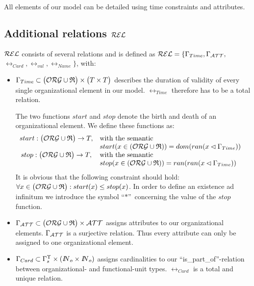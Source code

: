 	All elements of our model can be detailed using time constraints and attributes.

\subsection{Additional relations $\mathcal{REL}$}

	$\mathcal{REL}$ consists of several relations and is defined as $\mathcal{REL} =\{ \Gamma_{Time}, \Gamma_{\mathcal{ATT}},$ $\rel_{Card}, \rel_{val}, \rel_{Name}\}$, with:

	\begin{itemize}
	\item $\Gamma_{Time} \subset \bigl( \mathcal{ORG} \cup \mathfrak{R} \bigr)\times \bigl( T \times T \bigr)$ describes the duration of validity of every single organizational element in our model. $\rel_{Time}$ therefore has to be a total relation.

The two functions $start$ and $stop$ denote the birth and death of an organizational element. We define these functions as:
			$$
			\begin{array}{cll}
			start: \bigl( \mathcal{ORG} \cup \mathfrak{R} \bigr) \rightarrow T, &
				\mbox{with the semantic} & \\
				& start(x \in ( \mathcal{ORG} \cup \mathfrak{R} ) ) =
				dom( ran ( x \lhd \Gamma_{Time})) & \\
			stop: \bigl( \mathcal{ORG} \cup \mathfrak{R} \bigr) \rightarrow T, &
				\mbox{with the semantic} & \\
				& stop(x \in ( \mathcal{ORG} \cup \mathfrak{R} ) ) =
				ran( ran ( x \lhd \Gamma_{Time})) & \\
			\end{array}
			$$
It is obvious that the following constraint should hold: $\forall x \in \bigl( \mathcal{ORG} \cup \mathfrak{R} \bigr): start(x) \leq stop(x)$.  In order to define an existence ad infinitum we introduce the symbol ``$*$''\ concerning the value of the $stop$ function.

	\item $\Gamma_{\mathcal{ATT}} \subset \bigl( \mathcal{ORG} \cup \mathfrak{R} \bigr) \times \mathcal{ATT}$ assigns attributes to our organizational elements.
		$\Gamma_{\mathcal{ATT}}$ is a surjective relation. Thus every attribute can only be assigned to one organizational element.

	\item $\Gamma_{Card} \subset {\Gamma}^{\Upsilon}_{s} \times ({ I\!\!N}_{o} \times { I\!\!N}_{o})$ assigns cardinalities to our ``is\_part\_of''-relation between organizational- and functional-unit types. $\rel_{Card}$ is a total and unique relation.


\end{itemize}
